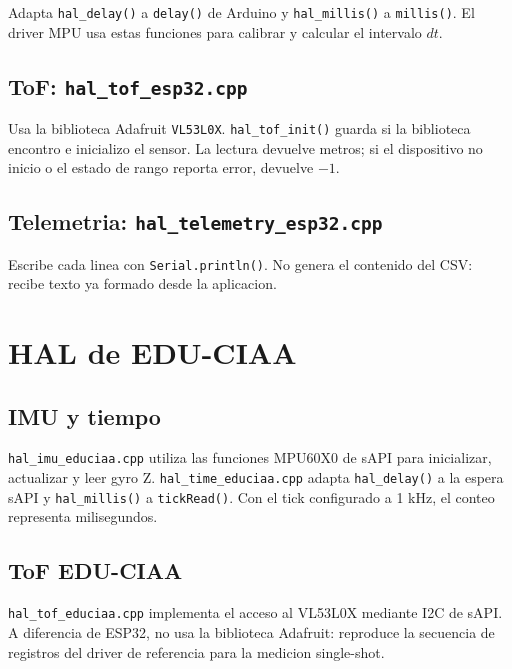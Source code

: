 \documentclass[11pt,a4paper]{article}
\begin{document}
Adapta \texttt{hal\_delay()} a \texttt{delay()} de Arduino y
\texttt{hal\_millis()} a \texttt{millis()}. El driver MPU usa estas funciones
para calibrar y calcular el intervalo $dt$.

\subsection{ToF: \texttt{hal\_tof\_esp32.cpp}}

Usa la biblioteca Adafruit \texttt{VL53L0X}. \texttt{hal\_tof\_init()} guarda
si la biblioteca encontro e inicializo el sensor. La lectura devuelve metros;
si el dispositivo no inicio o el estado de rango reporta error, devuelve $-1$.

\subsection{Telemetria: \texttt{hal\_telemetry\_esp32.cpp}}

Escribe cada linea con \texttt{Serial.println()}. No genera el contenido del
CSV: recibe texto ya formado desde la aplicacion.

\section{HAL de EDU-CIAA}

\subsection{IMU y tiempo}

\texttt{hal\_imu\_educiaa.cpp} utiliza las funciones MPU60X0 de sAPI para
inicializar, actualizar y leer gyro Z. \texttt{hal\_time\_educiaa.cpp} adapta
\texttt{hal\_delay()} a la espera sAPI y \texttt{hal\_millis()} a
\texttt{tickRead()}. Con el tick configurado a 1 kHz, el conteo representa
milisegundos.

\subsection{ToF EDU-CIAA}

\texttt{hal\_tof\_educiaa.cpp} implementa el acceso al VL53L0X mediante I2C de
sAPI. A diferencia de ESP32, no usa la biblioteca Adafruit: reproduce la
secuencia de registros del driver de referencia para la medicion single-shot.
\end{document}
